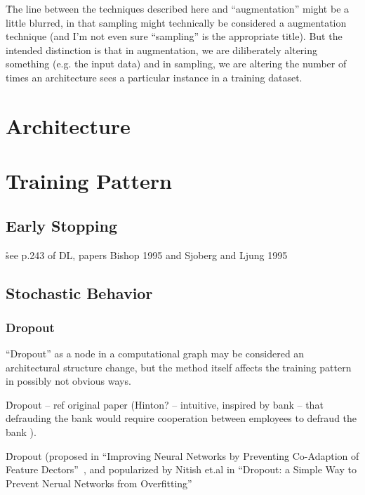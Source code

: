\r{The line between the techniques described here and ``augmentation'' might be a little blurred, in that sampling might technically be considered a augmentation technique (and I'm not even sure ``sampling'' is the appropriate title). But the intended distinction is that in augmentation, we are diliberately altering something (e.g. the input data) and in sampling, we are altering the number of times an architecture sees a particular instance in a training dataset.}




\section{Architecture}

\section{Training Pattern}

\subsection{Early Stopping}

\r{see p.243 of DL, papers Bishop 1995 and Sjoberg and Ljung 1995}



\subsection{Stochastic Behavior}

\subsubsection{Dropout}

\r{``Dropout'' as a node in a computational graph may be considered an architectural structure change, but the method itself affects the training pattern in possibly not obvious ways. }


\r{Dropout -- ref original paper (Hinton? -- intuitive, inspired by bank -- that defrauding the bank would require cooperation between employees to defraud the bank )}.

\r{Dropout (proposed in ``Improving Neural Networks by Preventing Co-Adaption of Feature Dectors''~\cite{DBLP:journals/corr/abs-1207-0580}, and popularized by Nitish et.al in ``Dropout: a Simple Way to Prevent Nerual Networks from Overfitting''~\cite{JMLR:v15:srivastava14a}}

